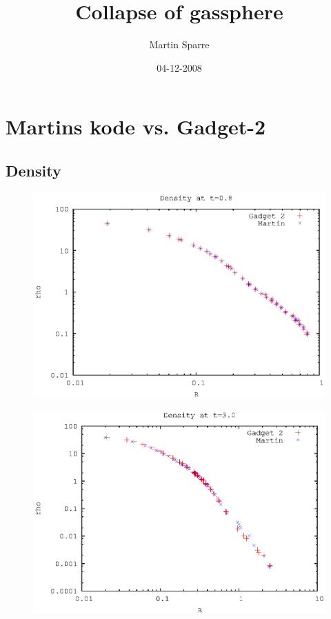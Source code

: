 \documentclass[11pt,a4paper]{article} %
\title{Collapse of gassphere}
\author{Martin Sparre}
\date{04-12-2008}
\begin{document}
\section*{Martins kode vs. Gadget-2}
\subsection*{Density}
\begin{figure}[H]
\centering
\includegraphics[width=\textwidth]{logrho0.8.eps}
\end{figure}

\begin{figure}[H]
\centering
\includegraphics[width=\textwidth]{logrho3.0.eps}
\end{figure}
\end{document}
